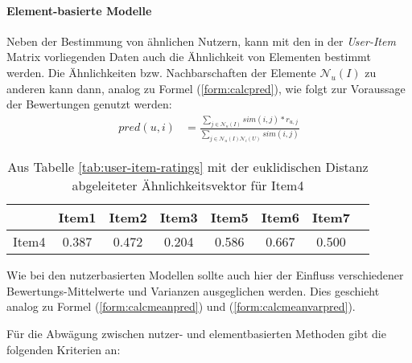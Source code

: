 \paragraph{Element-basierte Modelle} Neben der Bestimmung von ähnlichen Nutzern, kann mit den in der \textit{User-Item} Matrix vorliegenden Daten auch die Ähnlichkeit von Elementen bestimmt werden. Die Ähnlichkeiten bzw. Nachbarschaften der Elemente $\mathcal{N}_u(I)$ zu anderen kann dann, analog zu Formel (\ref{form:calcpred}), wie folgt zur Voraussage der Bewertungen genutzt werden: 
\begin{align}
pred(u,i) & = \frac{ \sum_{j \in \mathcal{N}_u(I)} sim(i,j)*r_{u,j}}{ \sum_{j \in \mathcal{N}_u(I)\mathcal{N}_i(U)} sim(i,j) } \label{form:calcpreditem}
\end{align}
\begin{table}
  \centering
  \begin{tabular}{ | l || c | c | c | c | c | c | c | }
    \hline
           & Item1 & Item2 & Item3 & Item5 & Item6 & Item7 \\ \hline
Item4 &    0.387 &	0.472 &	0.204 & 0.586 & 0.667 & 0.500 \\	
    \hline
  \end{tabular}
  \caption{\footnotesize Aus Tabelle \ref{tab:user-item-ratings} mit der euklidischen Distanz abgeleiteter Ähnlichkeitsvektor für Item4}
  \label{tab:item-item-sim}
\end{table}
Wie bei den nutzerbasierten Modellen sollte auch hier der Einfluss verschiedener Bewertungs-Mittelwerte und Varianzen ausgeglichen werden. Dies geschieht analog zu Formel (\ref{form:calcmeanpred}) und (\ref{form:calcmeanvarpred}).  

Für die Abwägung zwischen nutzer- und elementbasierten Methoden gibt \citep{hb_04} die folgenden Kriterien an:

